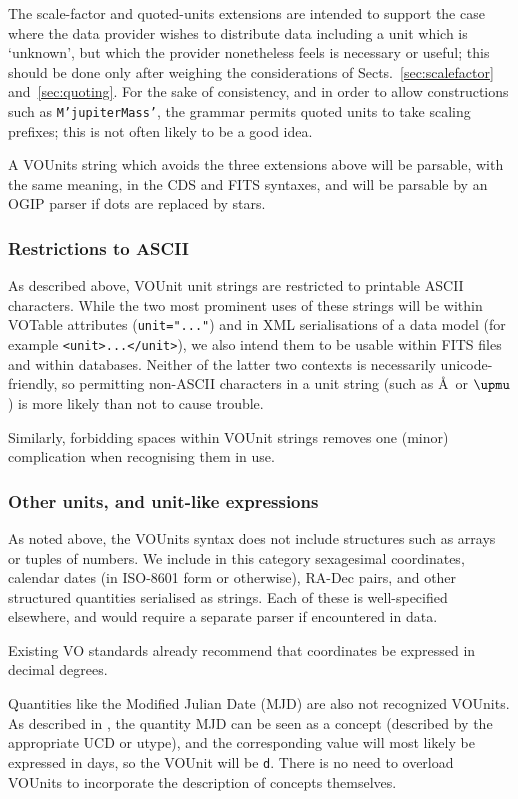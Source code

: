 \documentclass[11pt,a4paper]{ivoa}
\newcommand{\unit}[1]{\texttt{\small\color{orange}#1}}
\def\micro{{\ensuremath \mu}}
\def\micro{{\ensuremath \upmu}}
\begin{document}
The scale-factor and quoted-units extensions are intended to support
the case where the data provider wishes to distribute data including a
unit which is `unknown', but which the provider nonetheless feels is
necessary or useful; this should be done only after weighing the
considerations of Sects.~\ref{sec:scalefactor} and~\ref{sec:quoting}.
For the sake of consistency, and in order to allow
constructions such as \texttt{M'jupiterMass'}, the grammar permits quoted
units to take scaling prefixes; this is not often likely to be a good idea.

A VOUnits string which avoids the three extensions above will be
parsable, with the same meaning, in the CDS and FITS syntaxes, and
will be parsable by an OGIP parser if dots are replaced by stars.

\subsubsection{Restrictions to ASCII}

As described above, VOUnit unit strings are restricted to printable
ASCII characters.  While the two most prominent uses of these strings
will be within VOTable attributes (\verb|unit="..."|) and in XML
serialisations of a data model (for example \verb|<unit>...</unit>|),
we also intend them to be usable within FITS files and within
databases.  Neither of the latter two contexts is necessarily
unicode-friendly, so permitting non-ASCII characters in a unit string
(such as \AA\ or $\micro$) is more likely than not to cause trouble.

Similarly, forbidding spaces within VOUnit strings removes one (minor)
complication when recognising them in use.

\subsubsection{Other units, and unit-like expressions}

As noted above, the VOUnits syntax does not include structures such as
arrays or tuples of numbers.  We include in this category sexagesimal
coordinates, calendar dates (in ISO-8601 form or otherwise),
RA-Dec pairs, and other structured quantities serialised as strings.
Each of these is well-specified elsewhere, and would require a
separate parser if encountered in data.

Existing VO standards already recommend that coordinates be expressed
in decimal degrees.

Quantities like the Modified Julian Date (MJD) are also not recognized
VOUnits. As described in , the quantity MJD
can be seen as a concept (described by the appropriate UCD or utype),
and the corresponding value will most likely be expressed in days, so
the VOUnit will be \unit{d}. There is no need to overload VOUnits to
incorporate the description of concepts themselves.
\end{document}
